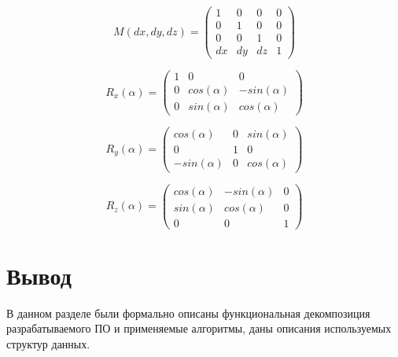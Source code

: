 \begin{equation}\label{eq:matrix_move}
	M(dx, dy, dz) = \begin{pmatrix}
		1 & 0 & 0 & 0 \\
		0 & 1 & 0 & 0 \\
		0 & 0 & 1 & 0 \\
		dx & dy & dz & 1
	\end{pmatrix}
\end{equation}

\begin{equation}\label{eq:matrix_rotate_x}
	R_x(\alpha) = \begin{pmatrix}
		1 & 0 & 0 \\
		0 & cos(\alpha) & -sin(\alpha) \\
		0 & sin(\alpha) & cos(\alpha)
	\end{pmatrix}
\end{equation}

\begin{equation}\label{eq:matrix_rotate_y}
	R_y(\alpha) = \begin{pmatrix}
		cos(\alpha) & 0 & sin(\alpha) \\
		0 & 1 & 0 \\
		-sin(\alpha) & 0 & cos(\alpha)
	\end{pmatrix}
\end{equation}

\begin{equation}\label{eq:matrix_rotate_z}
	R_z(\alpha) = \begin{pmatrix}
		cos(\alpha) & -sin(\alpha) & 0 \\
		sin(\alpha) & cos(\alpha) & 0 \\
		0 & 0 & 1
	\end{pmatrix}
\end{equation}

\section*{Вывод}

В данном разделе были формально описаны функциональная декомпозиция разрабатываемого ПО и применяемые алгоритмы, даны описания используемых структур данных.